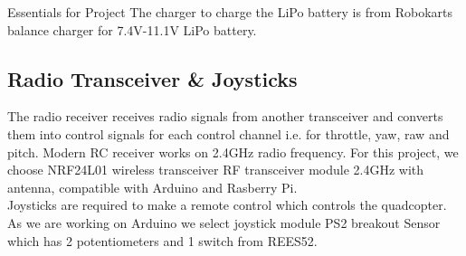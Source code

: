 \documentclass[12pt, oneside]{report}
\numberwithin{equation}{section}
\begin{document}
\begin{chapter}{Essentials for Project}
The charger to charge the LiPo battery is from Robokarts balance charger for 7.4V-11.1V LiPo battery.

\subsection{Radio Transceiver \& Joysticks}
The radio receiver receives radio signals from another transceiver and converts them into control signals for each control channel i.e. for throttle, yaw, raw and pitch. Modern RC receiver works on 2.4GHz radio frequency. For this project, we choose NRF24L01 wireless transceiver RF transceiver module 2.4GHz with antenna, compatible with Arduino and Rasberry Pi.\\
Joysticks are required to make a remote control which controls the quadcopter. As we are working on Arduino we select joystick module PS2 breakout Sensor which has 2 potentiometers and 1 switch from REES52.


\end{chapter}
\end{document}
